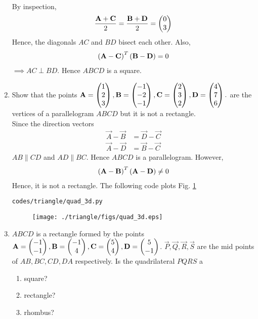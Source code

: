 \documentclass[journal,12pt,twocolumn]{IEEEtran}
\renewcommand\thesection{\arabic{section}}
\begin{document}
\begin{enumerate}[label=\thesection.\arabic*.,ref=\thesection.\theenumi]
\\
\solution By inspection, 
%
\begin{align}
\frac{\mathbf{A}+\mathbf{C}}{2}=\frac{\mathbf{B}+\mathbf{D}}{2} = \begin{pmatrix}0\\3\end{pmatrix}
\end{align}
%
Hence, the diagonals $AC$ and $BD$ bisect each other.
%
Also, 
\begin{align}
\left(\mathbf{A}-\mathbf{C}\right)^T
\left(\mathbf{B}-\mathbf{D}\right) = 0
\end{align}
%
$\implies AC \perp BD $.  Hence $ABCD$ is a square.
\item Show that the points 
$\mathbf{A} = \begin{pmatrix}1\\2\\3\end{pmatrix},
 \mathbf{B} = \begin{pmatrix}-1\\-2\\-1\end{pmatrix},
\mathbf{C} = \begin{pmatrix}2\\3\\2\end{pmatrix},
\mathbf{D} = \begin{pmatrix}4\\7\\6\end{pmatrix}.
$
are the vertices of a parallelogram $ABCD$ but it is not a rectangle.
%
\\
\solution Since the direction vectors
%
\begin{align}
\vec{A}-\vec{B}&= \vec{D}-\vec{C}
\\
\vec{A}-\vec{D}&= \vec{B}-\vec{C}
\end{align}
%
$AB \parallel CD$ and $AD \parallel BC$.  Hence $ABCD$ is a parallelogram.  However, 
%
\begin{align}
\left(\mathbf{A}-\mathbf{B}\right)^T\left( \mathbf{A}-\mathbf{D}\right)\ne 0
\end{align}
%
Hence, it is not a rectangle.
The following code plots Fig. \ref{fig:quad_3d}
%
\begin{lstlisting}
codes/triangle/quad_3d.py
\end{lstlisting}
%
\begin{figure}[!ht]
\texttt{[image: ./triangle/figs/quad\_3d.eps]}
\caption{}
\label{fig:quad_3d}
\end{figure}
%

\item $ABCD$ is a rectangle formed by the points $\mathbf{A} = \begin{pmatrix}-1\\-1\end{pmatrix}, \mathbf{B} = \begin{pmatrix}-1\\4\end{pmatrix}, \mathbf{C} = \begin{pmatrix}5\\4\end{pmatrix}, \mathbf{D} = \begin{pmatrix}5\\-1\end{pmatrix}$. $ \vec{P}, \vec{Q}, \vec{R}, \vec{S}$ are the mid points of $AB, BC, CD, DA$ respectively.  Is the quadrilateral $PQRS$ a 
\begin{enumerate}
\item square?
\item rectangle?
\item rhombus?
\end{enumerate}
\solution
%
\end{enumerate}
\end{document}
